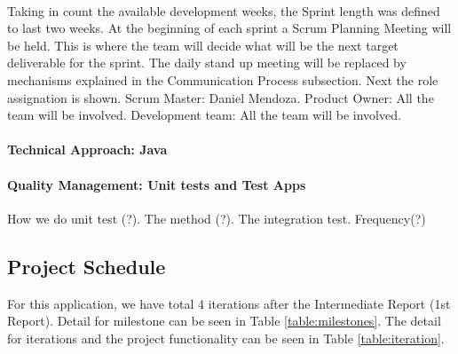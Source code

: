 \documentclass[11pt]{article}
\begin{document}
	\paragraph{}Taking in count the available development weeks, the Sprint length was defined to last two weeks. At the beginning of each sprint a Scrum Planning Meeting will be held. This is where the team will decide what will be the next target deliverable for the sprint. The daily stand up meeting will be replaced by mechanisms explained in the Communication Process subsection.
	Next the role assignation is shown. Scrum Master: Daniel Mendoza. Product Owner: All the team will be involved. Development team: All the team will be involved.
	\paragraph{Technical Approach: Java} 
	
	\paragraph{Quality Management: Unit tests and Test Apps} How we do unit test (?). The method (?). The integration test. Frequency(?)
\subsection{Project Schedule}

 For this application, we have total 4 iterations after the Intermediate Report (1st Report). Detail for milestone can be seen in Table \ref{table:milestones}. The detail for iterations and the project functionality can be seen in Table \ref{table:iteration}.
 
\end{document}
